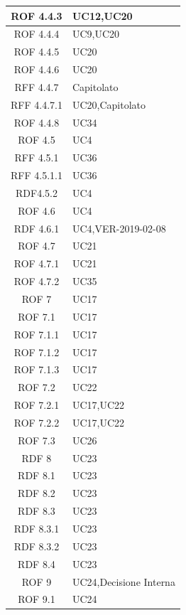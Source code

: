 \begin{center}
\begin{longtable}[c]{|c|m{}|}
\hline
ROF 4.4.3 & UC12,UC20 \\
\hline
\rowcolor{grigio}ROF 4.4.4 & UC9,UC20 \\
\hline
ROF 4.4.5 & UC20 \\
\hline
\rowcolor{grigio}ROF 4.4.6 & UC20 \\
\hline
RFF 4.4.7 & Capitolato \\
\hline
\rowcolor{grigio}RFF 4.4.7.1 & UC20,Capitolato \\
\hline
ROF 4.4.8 & UC34 \\
\hline
\rowcolor{grigio}ROF 4.5 & UC4 \\
\hline
RFF 4.5.1 & UC36 \\
\hline
\rowcolor{grigio}RFF 4.5.1.1 & UC36 \\
\hline
RDF4.5.2 & UC4\\
\hline
\rowcolor{grigio}ROF 4.6 & UC4 \\
\hline
RDF 4.6.1 & UC4,VER-2019-02-08 \\
\hline
\rowcolor{grigio}ROF 4.7 & UC21 \\
\hline
ROF 4.7.1 & UC21 \\
\hline
\rowcolor{grigio}ROF 4.7.2 & UC35 \\
\hline
ROF 7 & UC17 \\
\hline
\rowcolor{grigio}ROF 7.1 & UC17 \\
\hline
ROF 7.1.1 & UC17 \\
\hline
\rowcolor{grigio}ROF 7.1.2 & UC17 \\
\hline
ROF 7.1.3 & UC17 \\
\hline
\rowcolor{grigio}ROF 7.2 & UC22 \\
\hline
ROF 7.2.1 & UC17,UC22 \\
\hline
\rowcolor{grigio}ROF 7.2.2 & UC17,UC22 \\
\hline
ROF 7.3 & UC26 \\
\hline
\rowcolor{grigio}RDF 8 & UC23 \\
\hline
RDF 8.1 & UC23 \\
\hline
\rowcolor{grigio}RDF 8.2 & UC23 \\
\hline
RDF 8.3 & UC23 \\
\hline
\rowcolor{grigio}RDF 8.3.1 & UC23 \\
\hline
RDF 8.3.2 & UC23 \\
\hline
\rowcolor{grigio}RDF 8.4 & UC23 \\
\hline
ROF 9 & UC24,Decisione Interna \\
\hline
\rowcolor{grigio}ROF 9.1 & UC24 \\

\end{longtable}
\end{center}
